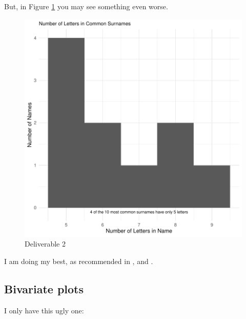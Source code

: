 \documentclass[a4paper, 12pt]{article}
\begin{document}
But, in Figure \ref{fig:theDeli_2} you may see something even worse.

\begin{figure}[h]
\centering
\includegraphics{draft_paper_v4-theDeli_2}
\caption{Deliverable 2}  %
\label{fig:theDeli_2} %
\end{figure}
I am doing my best, as recommended in \citet{magallanes_reyes_data_2022}, and \citet{leisch_sweave_2024}. 

\subsection{Bivariate plots}

I only have this ugly one:
\end{document}
